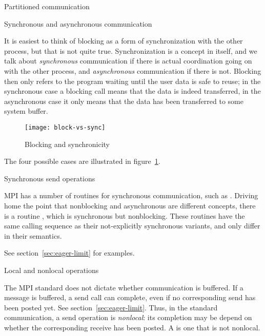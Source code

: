 \begin{mpifournote}{Partitioned communication}
\end{mpifournote}

 {Synchronous and asynchronous communication}

It is easiest to think of blocking as a form of synchronization with
the other process, but that is not quite true. Synchronization is a
concept in itself, and we talk about \emph{synchronous} communication
if there is actual coordination going on with the other process,
and \emph{asynchronous} communication if there is not. Blocking then
only refers to the program waiting until the user data is safe
to reuse; in the synchronous case a blocking call means that the data
is indeed transferred, in the asynchronous case it only means that the
data has been transferred to some system buffer.
%
\begin{figure}[ht]
\texttt{[image: block-vs-sync]}
\caption{Blocking and synchronicity}
\label{fig:block-sync}
\end{figure}
The four possible cases are illustrated in figure~\ref{fig:block-sync}.

 {Synchronous send operations}
\label{sec:syncsend}

MPI has a number of routines for synchronous communication,
such as .
Driving home the point that nonblocking and asynchronous are
different concepts, there is a routine ,
which is synchronous but nonblocking.
These routines have the same calling sequence as their not-explicitly
synchronous variants, and only differ in their semantics.

See section~\ref{sec:eager-limit} for examples.


 {Local and nonlocal operations}
\label{sec:mpi-local-non}
\label{sec:local-non-send}

The MPI standard does not dictate whether communication is buffered.
If a message is buffered, a send call can complete,
even if no corresponding send has been posted yet.
See section~\ref{sec:eager-limit}.
Thus, in the standard communication, a send operation
is \emph{nonlocal}: its completion may be depend on
whether the corresponding receive has been posted.
A  is one that is not nonlocal.

